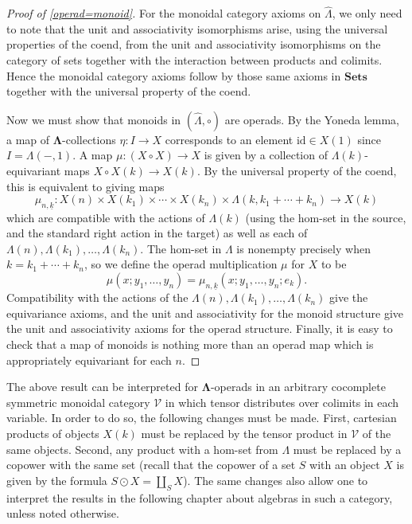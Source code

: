 \documentclass{amsbook} %
\newcommand{\mb}{\mathbf}
\newcommand{\ML}{\mathbf{\Lambda}}
\numberwithin{section}{chapter}
\begin{document}
\begin{proof}[Proof of \ref{operad=monoid}]
For the monoidal category axioms on $\hat{\mathbb{\Lambda}}$, we only need to note that the unit and associativity isomorphisms arise, using the universal properties of the coend, from the unit and associativity isomorphisms on the category of sets together with the interaction between products and colimits.  Hence the monoidal category axioms follow by those same axioms in $\mb{Sets}$ together with the universal property of the coend.

Now we must show that monoids in $(\hat{\mathbb{\Lambda}}, \circ)$ are operads.  By the Yoneda lemma, a map of $\ML$-collections $\eta \colon I \rightarrow X$ corresponds to an element $\textrm{id} \in X(1)$ since $I = \mathbb{\Lambda}(-,1)$.  A map $\mu \colon (X \circ X) \rightarrow X$ is given by a collection of $\Lambda(k)$-equivariant maps $X \circ X (k) \rightarrow X(k)$.  By the universal property of the coend, this is equivalent to giving maps
\[
\mu_{n, \underline{k}} \colon X(n) \times X(k_{1}) \times \cdots \times X(k_{n}) \times \mathbb{\Lambda}(k, k_{1}+\cdots +k_{n}) \rightarrow X(k)
\]
which are compatible with the actions of $\Lambda(k)$ (using the hom-set in the source, and the standard right action in the target) as well as each of $\Lambda(n), \Lambda(k_{1}), \ldots, \Lambda(k_{n})$.  The hom-set in $\mathbb{\Lambda}$ is nonempty precisely when $k=k_{1} + \cdots + k_{n}$, so we define the operad multiplication $\mu$ for $X$ to be
\[
\mu (x; y_{1}, \ldots, y_{n}) = \mu_{n, \underline{k}}(x; y_{1}, \ldots, y_{n}; e_{k}).
\]
Compatibility with the actions of the  $\Lambda(n), \Lambda(k_{1}), \ldots, \Lambda(k_{n})$ give the equivariance axioms, and the unit and associativity for the monoid structure give the unit and associativity axioms for the operad structure.  Finally, it is easy to check that a map of monoids is nothing more than an operad map which is appropriately equivariant for each $n$.
\end{proof}

\begin{rem}
The above result can be interpreted for $\ML$-operads in an arbitrary cocomplete symmetric monoidal category $\mathcal{V}$ in which tensor distributes over colimits in each variable.  In order to do so, the following changes must be made.  First, cartesian products of objects $X(k)$ must be replaced by the tensor product in $\mathcal{V}$ of the same objects.  Second, any product with a hom-set from $\mathbb{\Lambda}$ must be replaced by a copower with the same set (recall that the copower of a set $S$ with an object $X$ is given by the formula $S \odot X = \coprod_{S} X$).  The same changes also allow one to interpret the results in the following chapter about algebras in such a category, unless noted otherwise.
\end{rem}
\end{document}
